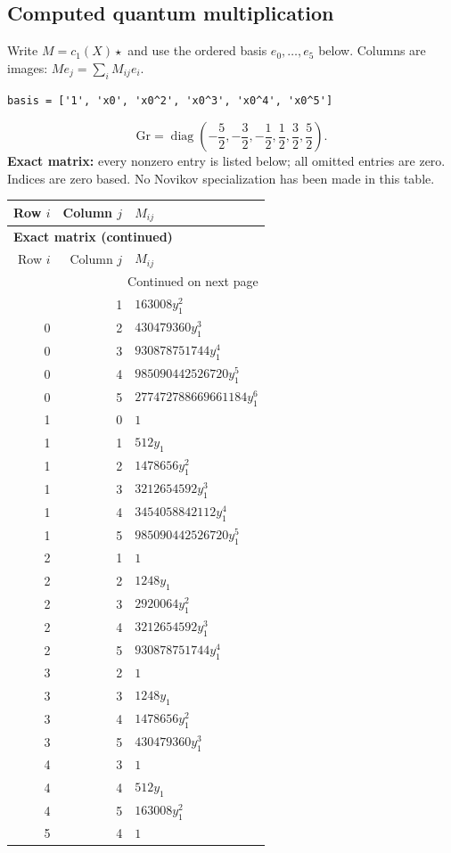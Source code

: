\documentclass[10pt,a4paper]{article}
\begin{document}
\subsection*{Computed quantum multiplication}
Write $M=c_1(X)\star$ and use the ordered basis $e_0,\ldots,e_{5}$ below. Columns are images: $M e_j=\sum_i M_{ij}e_i$.
\begin{lstlisting}
basis = ['1', 'x0', 'x0^2', 'x0^3', 'x0^4', 'x0^5']
\end{lstlisting}
\[\mathrm{Gr}=\operatorname{diag}\!\left(- \frac{5}{2},- \frac{3}{2},- \frac{1}{2},\frac{1}{2},\frac{3}{2},\frac{5}{2}\right).\]
\textbf{Exact matrix:} every nonzero entry is listed below; all omitted entries are zero. Indices are zero based. No Novikov specialization has been made in this table.
{\small\setlength{\tabcolsep}{7pt}\begin{longtable}{rrp{125mm}}
\toprule Row $i$ & Column $j$ & $M_{ij}$\\\midrule\endfirsthead
\multicolumn{3}{l}{\textbf{Exact matrix (continued)}}\\
\toprule Row $i$ & Column $j$ & $M_{ij}$\\\midrule\endhead
\midrule\multicolumn{3}{r}{Continued on next page}\\\endfoot\bottomrule\endlastfoot
0 & 1 & $163008 y_{1}^{2}$\\
0 & 2 & $430479360 y_{1}^{3}$\\
0 & 3 & $930878751744 y_{1}^{4}$\\
0 & 4 & $985090442526720 y_{1}^{5}$\\
0 & 5 & $277472788669661184 y_{1}^{6}$\\
1 & 0 & $1$\\
1 & 1 & $512 y_{1}$\\
1 & 2 & $1478656 y_{1}^{2}$\\
1 & 3 & $3212654592 y_{1}^{3}$\\
1 & 4 & $3454058842112 y_{1}^{4}$\\
1 & 5 & $985090442526720 y_{1}^{5}$\\
2 & 1 & $1$\\
2 & 2 & $1248 y_{1}$\\
2 & 3 & $2920064 y_{1}^{2}$\\
2 & 4 & $3212654592 y_{1}^{3}$\\
2 & 5 & $930878751744 y_{1}^{4}$\\
3 & 2 & $1$\\
3 & 3 & $1248 y_{1}$\\
3 & 4 & $1478656 y_{1}^{2}$\\
3 & 5 & $430479360 y_{1}^{3}$\\
4 & 3 & $1$\\
4 & 4 & $512 y_{1}$\\
4 & 5 & $163008 y_{1}^{2}$\\
5 & 4 & $1$\\
\end{longtable}}
\end{document}
